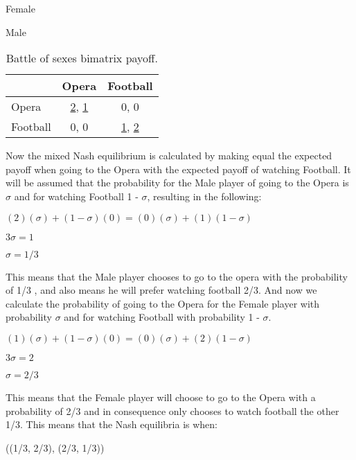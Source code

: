 \begin{table}[H]
\begin{center}
Female

Male
\begin{tabular}{|l|c|c|}
\hline
 & Opera & Football\\ 
\hline
Opera & \underline{2}, \underline{1} & 0, 0\\
\hline
Football & 0, 0 & \underline{1}, \underline{2}\\
\hline
\end{tabular}

\caption{ Battle of sexes bimatrix payoff.}
\label{fig:mpnashbos}	
\end{center}
\end{table}

Now the mixed Nash equilibrium is calculated by making equal the expected payoff  when going to the Opera with the expected payoff of watching Football. It will be assumed that the probability for the Male player of going to the Opera is $\sigma$ and for watching Football 1 - $\sigma$, resulting in the following:
\begin{center}
$(2)(\sigma) + (1 - \sigma)(0) = (0)(\sigma) + (1)(1 - \sigma)$
\end{center}
\begin{center}
$3\sigma = 1$
\end{center}
\begin{center}
$\sigma = 1/3$
\end{center}
This means that the Male player chooses to go to the opera with the probability of 1/3 , and also means he will prefer watching football 2/3. And now we calculate the probability of going to the Opera for the Female player with probability $\sigma$ and for watching Football with probability 1 - $\sigma$.

\begin{center}
$(1)(\sigma) + (1 - \sigma)(0) = (0)(\sigma) + (2)(1 - \sigma)$
\end{center}
\begin{center}
$3\sigma = 2$
\end{center}
\begin{center}
$\sigma = 2/3$
\end{center}

This means that the Female player will choose to go to the Opera with a probability of 2/3 and in consequence only chooses to watch football the other 1/3. 
This means that the Nash equilibria is when:
\begin{center}
((1/3, 2/3), (2/3, 1/3))
\end{center}

